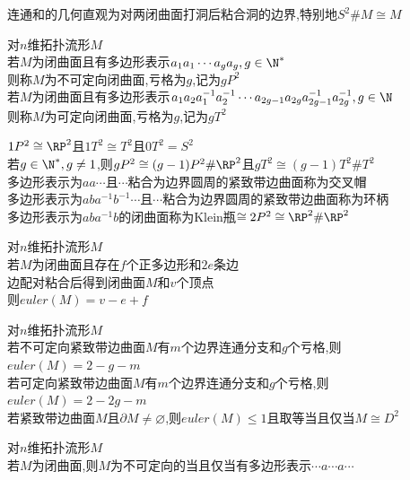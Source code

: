\begin{zhu}
连通和的几何直观为对两闭曲面打洞后粘合洞的边界,特别地$S^2\#M\cong M$
\end{zhu}

\begin{dingyi}
对$n$维拓扑流形$M$\\
若$M$为闭曲面且有多边形表示$a_{1}a_{1}\cdots a_{g}a_{g},g\in\N^*$\\
则称$M$为不可定向闭曲面,亏格为$g$,记为$gP^2$\\
若$M$为闭曲面且有多边形表示$a_{1}a_{2}a_{1}^{-1}a_{2}^{-1}\cdots a_{2g-1}a_{2g}a_{2g-1}^{-1}a_{2g}^{-1},g\in\N$\\
则称$M$为可定向闭曲面,亏格为$g$,记为$gT^2$
\end{dingyi}

\begin{zhu}
$1P^2\cong\RP^2$且$1T^2\cong T^2$且$0T^2=S^2$\\
若$g\in\N^*,g\neq 1$,则$gP^2\cong(g-1)P^2\#\RP^2$且$gT^2\cong(g-1)T^2\#T^2$\\
多边形表示为$aa\cdots$且$\cdots$粘合为边界圆周的紧致带边曲面称为交叉帽\\
多边形表示为$aba^{-1}b^{-1}\cdots$且$\cdots$粘合为边界圆周的紧致带边曲面称为环柄\\
多边形表示为$aba^{-1}b$的闭曲面称为Klein瓶$\cong 2P^2\cong \RP^2\#\RP^2$
\end{zhu}

\begin{dingli}
对$n$维拓扑流形$M$\\
若$M$为闭曲面且存在$f$个正多边形和$2e$条边\\
边配对粘合后得到闭曲面$M$和$v$个顶点\\
则$euler(M)=v-e+f$
\end{dingli}

\begin{dingli}
对$n$维拓扑流形$M$\\
若不可定向紧致带边曲面$M$有$m$个边界连通分支和$g$个亏格,则$euler(M)=2-g-m$\\
若可定向紧致带边曲面$M$有$m$个边界连通分支和$g$个亏格,则$euler(M)=2-2g-m$\\
若紧致带边曲面$M$且$\partial M\neq\varnothing$,则$euler(M)\leq 1$且取等当且仅当$M\cong D^2$
\end{dingli}

\begin{dingli}
对$n$维拓扑流形$M$\\
若$M$为闭曲面,则$M$为不可定向的当且仅当有多边形表示$\cdots a\cdots a\cdots$
\end{dingli}

